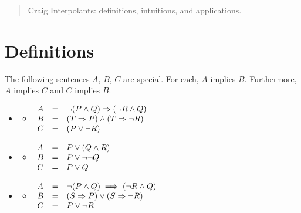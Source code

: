 \documentclass{article}
\begin{document}
\maketitle

\begin{abstract}
Craig Interpolants: definitions, intuitions, and applications.
\end{abstract}

\section{Definitions}

The following sentences $A$, $B$, $C$ are special.
For each, $A$ implies $B$.
Furthermore, $A$ implies $C$ and $C$ implies $B$.

\begin{itemize}
\item[]
  \begin{itemize}
  \item[]
    $\begin{array}{l l l}
      A & = & \neg(P \wedge Q) \Rightarrow (\neg R \wedge Q)
    \\B & = & (T \Rightarrow P) \wedge (T \Rightarrow \neg R)
    \\C & = & (P \vee \neg R)
    \end{array}$
  \end{itemize}
\item[]
  \begin{itemize}
  \item[]
    $\begin{array}{l l l}
      A & = & P \vee (Q \wedge R)
    \\B & = & P \vee \neg\neg Q
    \\C & = & P \vee Q
    \end{array}$
  \end{itemize}
\item[]
  \begin{itemize}
  \item[]
    $\begin{array}{l l l}
      A & = & \neg(P \wedge Q) \implies (\neg R \wedge Q)
    \\B & = & (S \Rightarrow P) \vee (S \Rightarrow \neg R)
    \\C & = & P \vee \neg R
    \end{array}$
  \end{itemize}
\end{itemize}
\end{document}
